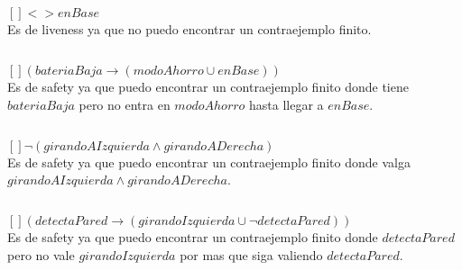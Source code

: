 \section{}
\subsection{}
$[] <> enBase$ \\

Es de liveness ya que no puedo encontrar un contraejemplo finito.

\subsection{}
$[](bateriaBaja \rightarrow (modoAhorro \cup enBase))$ \\

Es de safety ya que puedo encontrar un contraejemplo finito donde tiene $bateriaBaja$ pero no entra en $modoAhorro$ hasta llegar a $enBase$.

\subsection{}
$[] \neg (girandoAIzquierda \land girandoADerecha)$ \\

Es de safety ya que puedo encontrar un contraejemplo finito donde valga $girandoAIzquierda \land girandoADerecha$.

\subsection{}

$[] (detectaPared \rightarrow (girandoIzquierda \cup \neg detectaPared))$ \\


Es de safety ya que puedo encontrar un contraejemplo finito donde $detectaPared$ pero no vale $girandoIzquierda$ por mas que siga valiendo $detectaPared$.

\section{}
\subsection{}

